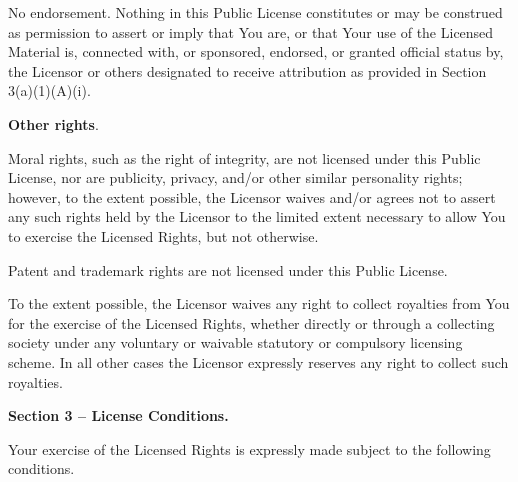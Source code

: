 \begin{doclicense@enumerate}
\begin{doclicense@enumerate}
\item No endorsement. Nothing in this Public License constitutes or may be construed as permission to assert or imply that You are, or that Your use of the Licensed Material is, connected with, or sponsored, endorsed, or granted official status by, the Licensor or others designated to receive attribution as provided in Section 3(a)(1)(A)(i).
\end{doclicense@enumerate}
\item \par \textbf{Other rights}.
\begin{doclicense@enumerate}
\item Moral rights, such as the right of integrity, are not licensed under this Public License, nor are publicity, privacy, and/or other similar personality rights; however, to the extent possible, the Licensor waives and/or agrees not to assert any such rights held by the Licensor to the limited extent necessary to allow You to exercise the Licensed Rights, but not otherwise.
\item Patent and trademark rights are not licensed under this Public License.
\item To the extent possible, the Licensor waives any right to collect royalties from You for the exercise of the Licensed Rights, whether directly or through a collecting society under any voluntary or waivable statutory or compulsory licensing scheme. In all other cases the Licensor expressly reserves any right to collect such royalties.
\end{doclicense@enumerate}

\end{doclicense@enumerate}
\par \textbf{Section 3 – License Conditions.}
\par Your exercise of the Licensed Rights is expressly made subject to the following conditions.
